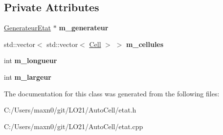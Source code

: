 \subsection*{Private Attributes}
\begin{DoxyCompactItemize}
\item 
\mbox{\label{class_etat_a914e5133fc90b6dc6b0bb31ea07aa1f0}} 
\mbox{\hyperlink{class_generateur_etat}{Generateur\+Etat}} $\ast$ {\bfseries m\+\_\+generateur}
\item 
\mbox{\label{class_etat_add8291e232f8219428147070f4126758}} 
std\+::vector$<$ std\+::vector$<$ \mbox{\hyperlink{class_cell}{Cell}} $>$ $>$ {\bfseries m\+\_\+cellules}
\item 
\mbox{\label{class_etat_a2c443f1746c2e88a83ebeb15612aeea7}} 
int {\bfseries m\+\_\+longueur}
\item 
\mbox{\label{class_etat_a227ad7e8e1bd5d692be7422444cb40d5}} 
int {\bfseries m\+\_\+largeur}
\end{DoxyCompactItemize}


The documentation for this class was generated from the following files\+:\begin{DoxyCompactItemize}
\item 
C\+:/\+Users/maxn0/git/\+L\+O21/\+Auto\+Cell/etat.\+h\item 
C\+:/\+Users/maxn0/git/\+L\+O21/\+Auto\+Cell/etat.\+cpp\end{DoxyCompactItemize}
